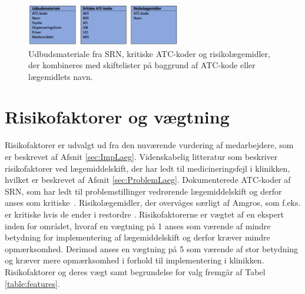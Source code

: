 \vspace{0.2cm}
\begin{figure}[H]\centering
\includegraphics[width=0.6\textwidth]{billeder/Input2.png} 
	\caption{Udbudsmateriale fra SRN, kritiske ATC-koder og risikolægemidler, der kombineres med skiftelister på baggrund af ATC-kode eller lægemidlets navn.}
	\label{fig:Input2}  
\end{figure}

\section{Risikofaktorer og vægtning}
Risikofaktorer er udvalgt ud fra den nuværende vurdering af medarbejdere, som er beskrevet af Afsnit \ref{sec:ImpLaeg}. Videnskabelig litteratur som beskriver risikofaktorer ved lægemiddelskift, der har ledt til medicineringsfejl i klinikken, hvilket er beskrevet af Afsnit \ref{sec:ProblemLaeg}. Dokumenterede ATC-koder af SRN, som har ledt til problemstillinger vedrørende lægemiddelskift og derfor anses som kritiske~\citep{SRN}. Risikolægemidler, der overvåges særligt af Amgros, som f.eks. er kritiske hvis de ender i restordre \citep{Amgros}. Risikofaktorerne er vægtet af en ekspert inden for området, hvoraf en vægtning på 1 anses som værende af mindre betydning for implementering af lægemiddelskift og derfor kræver mindre opmærksomhed. Derimod anses en vægtning på 5 som værende af stor betydning og kræver mere opmærksomhed i forhold til implementering i klinikken.
Risikofaktorer og deres vægt samt begrundelse for valg fremgår af Tabel \ref{table:features}.


